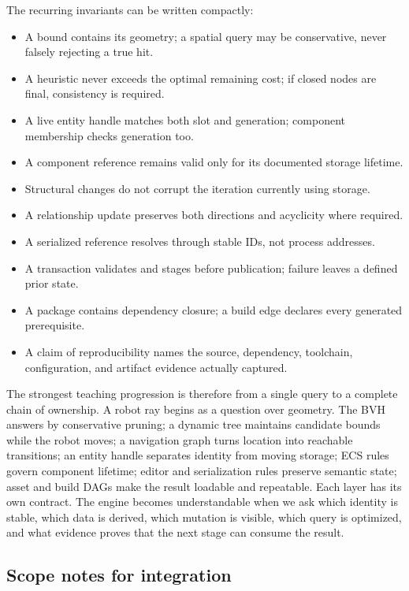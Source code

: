 The recurring invariants can be written compactly:

\begin{itemize}
\tightlist
\item
  A bound contains its geometry; a spatial query may be conservative, never falsely rejecting a true hit.
\item
  A heuristic never exceeds the optimal remaining cost; if closed nodes are final, consistency is required.
\item
  A live entity handle matches both slot and generation; component membership checks generation too.
\item
  A component reference remains valid only for its documented storage lifetime.
\item
  Structural changes do not corrupt the iteration currently using storage.
\item
  A relationship update preserves both directions and acyclicity where required.
\item
  A serialized reference resolves through stable IDs, not process addresses.
\item
  A transaction validates and stages before publication; failure leaves a defined prior state.
\item
  A package contains dependency closure; a build edge declares every generated prerequisite.
\item
  A claim of reproducibility names the source, dependency, toolchain, configuration, and artifact evidence actually captured.
\end{itemize}

The strongest teaching progression is therefore from a single query to a complete chain of ownership. A robot ray begins as a question over geometry. The BVH answers by conservative pruning; a dynamic tree maintains candidate bounds while the robot moves; a navigation graph turns location into reachable transitions; an entity handle separates identity from moving storage; ECS rules govern component lifetime; editor and serialization rules preserve semantic state; asset and build DAGs make the result loadable and repeatable. Each layer has its own contract. The engine becomes understandable when we ask which identity is stable, which data is derived, which mutation is visible, which query is optimized, and what evidence proves that the next stage can consume the result.

\subsection{Scope notes for integration}\label{05-engine-i-ch008-scope-notes-for-integration}

